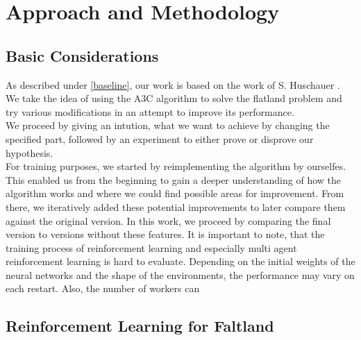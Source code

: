 %
%

\chapter{Approach and Methodology}\label{chap.vorgehen}
\section{Basic Considerations}\label{basic_cons}
As described under \autoref{baseline}, our work is based on the work of S. Huschauer \cite{flatland}. We take the idea of using the A3C algorithm to solve the flatland problem and try various modifications in an attempt to improve its performance.\\
We proceed by giving an intution, what we want to achieve by changing the specified part, followed by an experiment to either prove or disprove our hypothesis.\\
For training purposes, we started by reimplementing the algorithm by ourselfes. This enabled us from the beginning to gain a deeper understanding of how the algorithm works and where we could find possible areas for improvement. From there, we iteratively added these potential improvements to later compare them against the original version.
In this work, we proceed by comparing the final version to versions without these features. 
It is important to note, that the training process of reinforcement learning and especially multi agent reinforcement learning is hard to evaluate. Depending on the initial weights of the neural networks and the shape of the environments, the performance may vary on each restart. Also, the number of workers can 

\section{Reinforcement Learning for Faltland}
